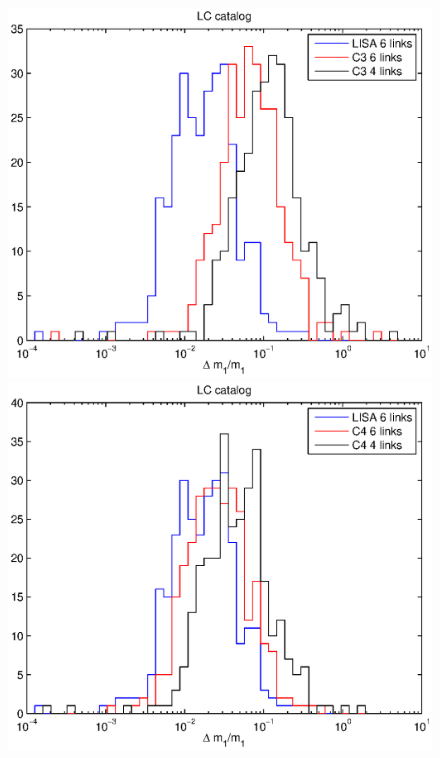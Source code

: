 \documentclass{iopart}
\begin{document}
\begin{figure}[H]
\includegraphics[scale=0.54]{FigSMBHRyanNeil/LCm13.eps}
\includegraphics[scale=0.54]{FigSMBHRyanNeil/LCm14.eps}

\end{figure}
\end{document}
